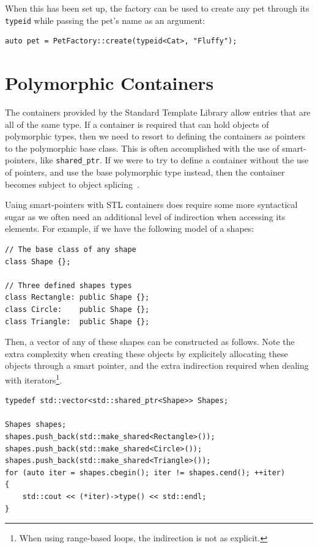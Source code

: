 \documentclass[10pt,a4paper,openany]{mudbook}
\makeatletter
\newcommand{\indextt}[2][]{\texttt{#2}\index{#2@\texttt{#2}#1}}
\makeatother
\begin{document}
When this has been set up, the factory can be used to create any pet through
its \texttt{typeid} while passing the pet's name as an argument:
\begin{lstlisting}[style=snippet]
auto pet = PetFactory::create(typeid<Cat>, "Fluffy");
\end{lstlisting} 


\chapter{Polymorphic Containers}
\label{chp:polymorphic containers}

The containers provided by the \Cpp Standard Template Library allow entries
that are all of the same type. If a container is required that can hold
objects of polymorphic types, then we need to resort to defining the containers
as pointers to the polymorphic base class. This is often accomplished with the
use of smart-pointers, like \indextt{shared\_ptr}. If we were to try to define
a container without the use of pointers, and use the base polymorphic type
instead, then the container becomes subject to object splicing~.

Uaing smart-pointers with STL containers does require some more syntactical
sugar as we often need an additional level of indirection when accessing its
elements. For example, if we have the following model of a shapes:

\begin{lstlisting}[style=snippet,
  caption={Polymorphic sample structure.},
  label=lst:polymorphic-sample]
// The base class of any shape
class Shape {};

// Three defined shapes types
class Rectangle: public Shape {};
class Circle:    public Shape {};
class Triangle:  public Shape {};
\end{lstlisting}

Then, a vector of any of these shapes can be constructed as follows. Note
the extra complexity when creating these objects by explicitely allocating
these objects through a smart pointer, and the extra indirection required
when dealing with iterators\footnote{When using range-based loops, the
indirection is not as explicit.}.

\begin{lstlisting}[style=snippet]
typedef std::vector<std::shared_ptr<Shape>> Shapes;

Shapes shapes;
shapes.push_back(std::make_shared<Rectangle>());
shapes.push_back(std::make_shared<Circle>());
shapes.push_back(std::make_shared<Triangle>());
for (auto iter = shapes.cbegin(); iter != shapes.cend(); ++iter)
{
    std::cout << (*iter)->type() << std::endl;
}
\end{lstlisting}
\end{document}

